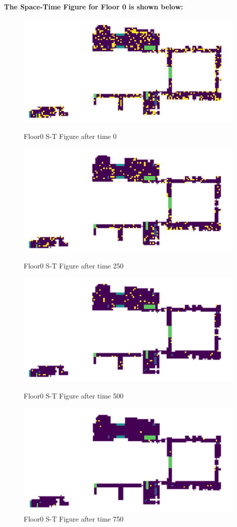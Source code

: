 \documentclass{mcmthesis}
\begin{document}
\noindent\textbf{The Space-Time Figure for Floor 0 is shown below:}
\begin{figure}[ht]
\parbox[b]{.5\textwidth}{
\includegraphics[scale=0.7]{0-1}
\centering\captionsetup{font=small, labelfont=bf}\caption{Floor0 S-T Figure after time 0}
}
\parbox[b]{.5\textwidth}{
\includegraphics[scale=0.7]{0-2}
\centering\captionsetup{font=small, labelfont=bf}\caption{Floor0 S-T Figure after time 250}
}
\parbox[b]{.5\textwidth}{
\includegraphics[scale=0.7]{0-3}
\centering\captionsetup{font=small, labelfont=bf}\caption{Floor0 S-T Figure after time 500}
}
\parbox[b]{.5\textwidth}{
\includegraphics[scale=0.7]{0-4}
\centering\captionsetup{font=small, labelfont=bf}\caption{Floor0 S-T Figure after time 750}
}
\end{figure}
\end{document}
